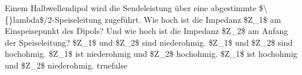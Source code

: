     {Einem Halbwellendipol wird die Sendeleistung über eine abgestimmte \$\textbackslash\{\}lambda\$/2-Speiseleitung zugeführt. Wie hoch ist die Impedanz \$Z\_1\$ am Einspeisepunkt des Dipols? Und wie hoch ist die Impedanz \$Z\_2\$ am Anfang der Speiseleitung?}
    {\$Z\_1\$ und \$Z\_2\$ sind niederohmig.}
    {\$Z\_1\$ und \$Z\_2\$ sind hochohmig.}
    {\$Z\_1\$ ist niederohmig und \$Z\_2\$ hochohmig.}
    {\$Z\_1\$ ist hochohmig und \$Z\_2\$ niederohmig.}
    {true}{false}